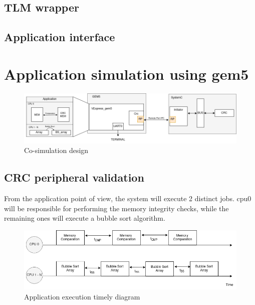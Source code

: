 \subsection{TLM wrapper}
\label{subsec::TLMwrapper}


\subsection{Application interface}


\section{Application simulation using gem5}


\begin{figure}[H]
	\centering
 	\includegraphics[width=0.9\linewidth]{Images/CoSimDesign.png}
 	\caption{Co-simulation design}
	 \label{fig_CoSimDesign}
\end{figure}

\subsection{CRC peripheral validation} 


From the application point of view, the system will execute 2 distinct jobs. \gls{cpu}0 will be responsible for 
performing the memory integrity checks, while the remaining ones will execute a bubble sort algorithm. 



\begin{figure}[]
	\centering
 	\includegraphics[width=0.7\linewidth]{Images/AppTimeDiagram.png}
 	\caption{Application execution timely diagram}
	 \label{fig_AppTimeDiagram}
\end{figure}


